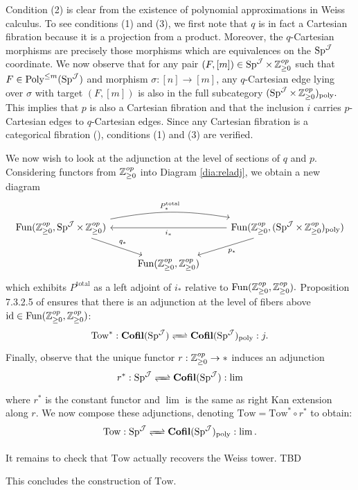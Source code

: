 \begin{cnstr}
Condition (2) is clear from the existence of polynomial approximations in Weiss calculus.  To see conditions (1) and (3), we first note that $q$ is in fact a Cartesian fibration because it is a projection from a product.  Moreover, the $q$-Cartesian morphisms are precisely those morphisms which are equivalences on the $\operatorname{\text{Sp}}^{\operatorname{\mathcal{J}}}$ coordinate.  We now observe that for any pair $(F, [m]) \in \operatorname{\text{Sp}}^{\operatorname{\mathcal{J}}}\times \operatorname{\mathbb{Z}}^{op}_{\geq 0}$ such that $F\in \operatorname{\text{Poly}}^{\leq m}(\operatorname{\text{Sp}}^{\operatorname{\mathcal{J}}})$ and morphism $\sigma :[n]\to [m]$, any $q$-Cartesian edge lying over $\sigma$ with target $(F, [m])$ is also in the full subcategory $(\operatorname{\text{Sp}}^{\operatorname{\mathcal{J}}}\times \operatorname{\mathbb{Z}}^{op}_{\geq 0})_{\text{poly}}.$  This implies that $p$ is also a Cartesian fibration and that the inclusion $i$ carries $p$-Cartesian edges to $q$-Cartesian edges.  Since any Cartesian fibration is a categorical fibration (\cite[Proposition 3.3.1.7]{HTT}), conditions (1) and (3) are verified.  

We now wish to look at the adjunction at the level of sections of $q$ and $p$.  Considering functors from $\operatorname{\mathbb{Z}}_{\geq 0}^{op}$ into Diagram \ref{dia:reladj}, we obtain a new diagram 
$$
\begin{tikzcd}
\Fun(\Z^{op}_{\geq 0},\Sp^{\J}\times \Z^{op}_{\geq 0}) \arrow[rr, bend left=10,"P^{\text{total}}_*"] \arrow[rd,"q_*"]& &\Fun(\Z^{op}_{\geq 0},(\Sp^{\J}\times \Z^{op}_{\geq 0})_{\text{poly}}) \arrow[ld,"p_*"]\arrow[ll,"i_*"]  \\
& \Fun(\Z^{op}_{\geq 0}, \Z^{op}_{\geq 0})
\end{tikzcd}
$$
which exhibits $P^{\text{total}}$ as a left adjoint of $i_*$ relative to $\operatorname{\text{Fun}}(\operatorname{\mathbb{Z}}_{\geq 0}^{op},\operatorname{\mathbb{Z}}_{\geq 0}^{op}).$  Proposition 7.3.2.5 of \cite{HA} ensures that there is an adjunction at the level of fibers above $\text{id}\in \operatorname{\text{Fun}}(\operatorname{\mathbb{Z}}_{\geq 0}^{op},\operatorname{\mathbb{Z}}_{\geq 0}^{op})$: $$\text{Tow}^*: \Cofil(\Sp^{\J}) \xrightleftharpoons{\quad} \Cofil(\Sp^{\J})_{\text{poly}}:j .$$  
Finally, observe that the unique functor $r: \operatorname{\mathbb{Z}}^{op}_{\geq 0} \to *$ induces an adjunction $$r^*: \Sp^{\J} \xrightleftharpoons{\quad} \Cofil(\Sp^{\J}): \lim$$ where $r^*$ is the constant functor and $\lim$ is the same as right Kan extension along $r$.  We now compose these adjunctions, denoting $\text{Tow} = \text{Tow}^*\circ r^*$ to obtain: $$\text{Tow}: \Sp^{\J} \xrightleftharpoons{\quad}  \Cofil(\Sp^{\J})_{\text{poly}}: \lim.$$

It remains to check that $\text{Tow}$ actually recovers the Weiss tower.  TBD%


This concludes the construction of $\text{Tow}.$ 
\end{cnstr}


